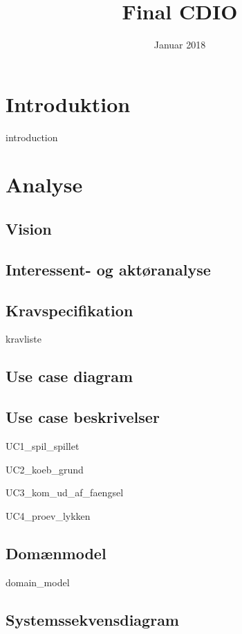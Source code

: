 \documentclass{article}
\title{Final CDIO}
\author{}
\date{Januar 2018}
\begin{document}
{\selectfont
\maketitle
\thispagestyle{empty}
\newpage
\tableofcontents
\thispagestyle{empty}
\newpage
\clearpage
\setcounter{page}{1}

\section{Introduktion}
{introduction}

\section{Analyse}
\subsection{Vision}

\subsection{Interessent- og aktøranalyse}

\subsection{Kravspecifikation}
{kravliste}

\subsection{Use case diagram}
\newpage
\subsection{Use case beskrivelser}
{UC1_spil_spillet}

{UC2_koeb_grund}

{UC3_kom_ud_af_faengsel}

{UC4_proev_lykken}

\newpage
\subsection{Domænmodel}
{domain_model}

\subsection{Systemssekvensdiagram}

}
\end{document}
